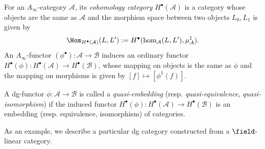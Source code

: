 \begin{defn}
For an $A_{\infty}$-category $\mathcal{A}$,
its \emph{cohomology category}
$H^{\bullet}(\mathcal{A})$
is a category whose objects are the same as $\mathcal{A}$
and the morphism space between two objects $L_0, L_1$ is given by
$$
\Hom_{H^{\bullet}(\mathcal{A})}(L,L')
:=
H^{\bullet}(\hom_{\mathcal{A}}(L,L'),\mu_{\mathcal{A}}^1).
$$
An $A_{\infty}$-functor $(\phi^{\bullet}):\mathcal{A}\rightarrow\mathcal{B}$
induces an ordinary functor
$H^{\bullet}(\phi):H^{\bullet}(\mathcal{A})\rightarrow H^{\bullet}(\mathcal{B})$,
whose mapping on objects is the same as $\phi$ and
the mapping on morphisms is given by $[f]\mapsto [\phi^1(f)]$.

A dg-functor $\phi:\mathcal{A}\rightarrow\mathcal{B}$ is called a
\emph{quasi-embedding}
(resp. \emph{quasi-equivalence}, \emph{quasi-isomorphism})
if the induced functor
$H^{\bullet}(\phi):H^{\bullet}(\mathcal{A})\rightarrow H^{\bullet}(\mathcal{B})$
is an embedding
(resp. equivalence, isomorphism)
of categories.
\end{defn}
As an example, we describe a particular dg category constructed from a $\field$-linear category.
